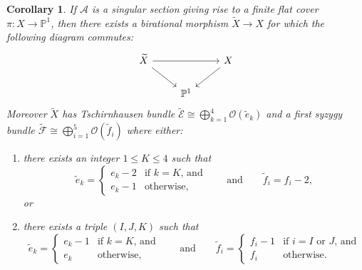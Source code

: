 \documentclass[11pt]{amsart}
\numberwithin{theorem}{section}
\numberwithin{equation}{section}
\newtheorem{coro}[theorem]{Corollary}
\theoremstyle{definition}\newtheorem{defn}[theorem]{Definition}
\theoremstyle{definition}\newtheorem{remark}[theorem]{Remark}
\theoremstyle{definition}\newtheorem{question}[theorem]{Question}
\theoremstyle{definition}\newtheorem{problem}[theorem]{Problem}
\newcommand{\PP}{\mathbb{P}}
\newcommand{\cE}{\mathcal{E}}
\newcommand{\cF}{\mathcal{F}}
\newcommand{\cA}{\mathcal{A}}
\newcommand{\cO}{\mathcal{O}}
\newcommand{\I}{I}
\newcommand{\J}{J}
\newcommand{\K}{K}
\begin{document}
\begin{coro}
\label{lemma:normalize-quintic}
    If $\cA$ is a singular section giving rise to a finite flat cover $\pi \colon X \rightarrow \PP^1$, then there exists a birational morphism $\widetilde{X} \to X$ for which the following diagram commutes:
\[
\begin{tikzcd}
	\widetilde{X} && X \\
	& \PP^1
	\arrow[from=1-1, to=1-3]
	\arrow[from=1-1, to=2-2]
	\arrow[from=1-3, to=2-2]
\end{tikzcd}
\]
Moreover $\widetilde{X}$ has Tschirnhausen bundle $\widetilde{\cE} \cong \bigoplus_{k=1}^4 \cO(\widetilde{e}_k)$ and a first syzygy bundle $\widetilde{\cF} \cong \bigoplus_{i=1}^5 \cO(\widetilde{f}_i)$ where either:
\begin{enumerate}[label=(\Alph*)]
    \item there exists an integer $1 \leq \K \leq 4$ such that 
    \begin{equation*}
        \widetilde{e}_k = \begin{cases}
            e_k - 2 & \text{if $k = \K$, and} \\
            e_k - 1 & \text{otherwise,}
        \end{cases}
        \qquad \text{and} \qquad
        \widetilde{f}_i = f_i - 2 ,
    \end{equation*}
    or
    \item there exists a triple $(\I, \J, \K)$ such that 
    \begin{equation*}
        \widetilde{e}_k = \begin{cases}
            e_k-1  & \text{if $k = \K$, and} \\
            e_k & \text{otherwise,}
        \end{cases}
        \qquad \text{and} \qquad
        \widetilde{f}_i = \begin{cases}
            f_i - 1  & \text{if $i = \I$ or $\J$, and} \\
            f_i & \text{otherwise.}
        \end{cases}        
    \end{equation*}
\end{enumerate}
\end{coro}
\end{document}
